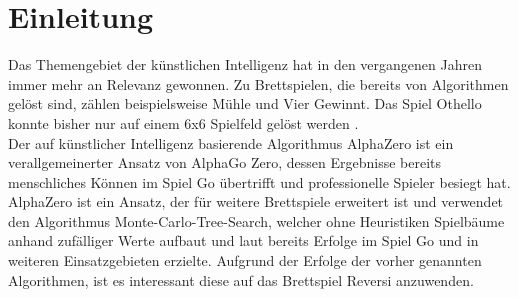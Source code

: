 \documentclass[12pt,a4paper,bibliography=totocnumbered,listof=totocnumbered]{article}
\begin{document}
\renewcommand{\sectionmark}[1]{\markright{#1}}
\renewcommand{\subsectionmark}[1]{}
\renewcommand{\subsubsectionmark}[1]{}
\rhead{\rightmark}

{}
\renewcommand{\thesection}{\arabic{section}}
\renewcommand{\theHsection}{\arabic{section}}
\setcounter{section}{0}
\setcounter{page}{1}

\section{Einleitung}
Das Themengebiet der künstlichen Intelligenz hat in den vergangenen Jahren immer mehr an Relevanz gewonnen. Zu Brettspielen, die bereits von Algorithmen gelöst sind, zählen beispielsweise Mühle und Vier Gewinnt. Das Spiel Othello konnte bisher nur auf einem 6x6 Spielfeld gelöst werden \cite{vandenHerik.2002}.\\
Der auf künstlicher Intelligenz basierende Algorithmus AlphaZero ist ein verallgemeinerter Ansatz von AlphaGo Zero, dessen Ergebnisse bereits menschliches Können im Spiel Go übertrifft und professionelle Spieler besiegt hat. AlphaZero ist ein Ansatz, der für weitere Brettspiele erweitert ist \cite{Silver.05.12.2017} und verwendet den Algorithmus Monte-Carlo-Tree-Search, welcher ohne Heuristiken Spielbäume anhand zufälliger Werte aufbaut und laut \cite{CameronBrowne.2012} bereits Erfolge im Spiel Go und in weiteren Einsatzgebieten erzielte. Aufgrund der Erfolge der vorher genannten Algorithmen, ist es interessant diese auf das Brettspiel Reversi anzuwenden.

\end{document}
